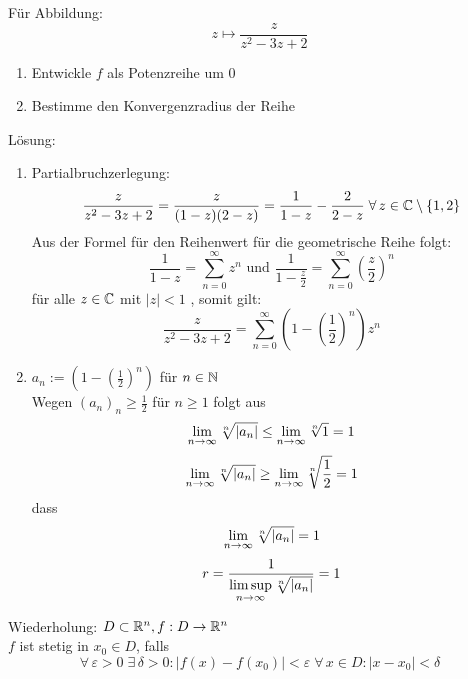 \documentclass[../ana1u.tex]{subfiles}
\begin{document}
\begin{bsp}
    Für Abbildung: 
    \[z \mapsto \frac{z}{z^2-3z+2} \]
    \begin{enumerate}
        \item Entwickle \(f \) als Potenzreihe um \(0 \)
        \item Bestimme den Konvergenzradius der Reihe
    \end{enumerate}
    Lösung:
    \begin{enumerate}
        \item Partialbruchzerlegung:
            \[\frac{z}{z^2-3z+2} = \frac{z}{(1-z)(2-z)} = \frac{1}{1-z} - \frac{2}{2-z} \; \forall \, z \in \mathbb{C} \setminus \{1,2\} \]
            Aus der Formel für den Reihenwert für die geometrische Reihe folgt:
            \[\frac{1}{1-z} = \sum_{n=0}^{\infty} z^n \text{ und } \frac{1}{1 - \frac{z}{2}} 
            = \sum_{n=0}^{\infty} \left(\frac{z}{2}\right)^n \]
            für alle \(z \in \mathbb{C} \) mit \(|z| < 1\) , somit gilt:
            \[\frac{z}{z^2-3z+2} = \sum_{n=0}^{\infty} \left(1 - \left(\frac{1}{2} \right)^n\right)z^n \]
        \item \(a_n := \left(1 - \left(\frac{1}{2}\right)^n\right) \) für \(n \in \mathbb{N} \) \\
            Wegen \((a_n)_n \geq \frac{1}{2} \) für \(n \geq 1 \) folgt aus
            \[\lim\limits_{n\rightarrow\infty} \sqrt[n]{|a_n|} \leq \lim\limits_{n\rightarrow\infty} \sqrt[n]{1} = 1 \]
            \[\lim\limits_{n\rightarrow\infty} \sqrt[n]{|a_n|} \geq \lim\limits_{n\rightarrow\infty} \sqrt[n]{\frac{1}{2}} = 1 \]
            dass
            \[\lim\limits_{n\rightarrow\infty} \sqrt[n]{|a_n|} = 1 \]
            \[r = \frac{1}{\limsup\limits_{n\rightarrow\infty} \sqrt[n]{|a_n|}} = 1 \]
    \end{enumerate}
\end{bsp}
Wiederholung: \(D \subset \mathbb{R}^n, f: D \rightarrow \mathbb{R}^n \) \\
\(f\) ist stetig in \(x_0 \in D\), falls 
\[\forall \, \varepsilon > 0 \; \exists \, \delta > 0: |f(x)-f(x_0)| < \varepsilon \; \forall \, x \in D: |x-x_0| < \delta \]
\end{document}
